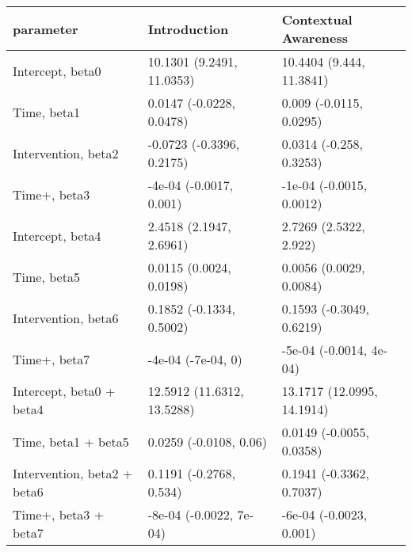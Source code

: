 \begin{table}[ht]
\centering
\begin{tabular}{lll}
  \hline
parameter & Introduction & Contextual Awareness \\ 
  \hline
Intercept, beta0 & 10.1301 (9.2491, 11.0353) & 10.4404 (9.444, 11.3841) \\ 
  Time, beta1 & 0.0147 (-0.0228, 0.0478) & 0.009 (-0.0115, 0.0295) \\ 
  Intervention, beta2 & -0.0723 (-0.3396, 0.2175) & 0.0314 (-0.258, 0.3253) \\ 
  Time+, beta3 & -4e-04 (-0.0017, 0.001) & -1e-04 (-0.0015, 0.0012) \\ 
  Intercept, beta4 & 2.4518 (2.1947, 2.6961) & 2.7269 (2.5322, 2.922) \\ 
  Time, beta5 & 0.0115 (0.0024, 0.0198) & 0.0056 (0.0029, 0.0084) \\ 
  Intervention, beta6 & 0.1852 (-0.1334, 0.5002) & 0.1593 (-0.3049, 0.6219) \\ 
  Time+, beta7 & -4e-04 (-7e-04, 0) & -5e-04 (-0.0014, 4e-04) \\ 
  Intercept, beta0 + beta4 & 12.5912 (11.6312, 13.5288) & 13.1717 (12.0995, 14.1914) \\ 
  Time, beta1 + beta5 & 0.0259 (-0.0108, 0.06) & 0.0149 (-0.0055, 0.0358) \\ 
  Intervention, beta2 + beta6 & 0.1191 (-0.2768, 0.534) & 0.1941 (-0.3362, 0.7037) \\ 
  Time+, beta3 + beta7 & -8e-04 (-0.0022, 7e-04) & -6e-04 (-0.0023, 0.001) \\ 
   \hline
\end{tabular}
\end{table}
